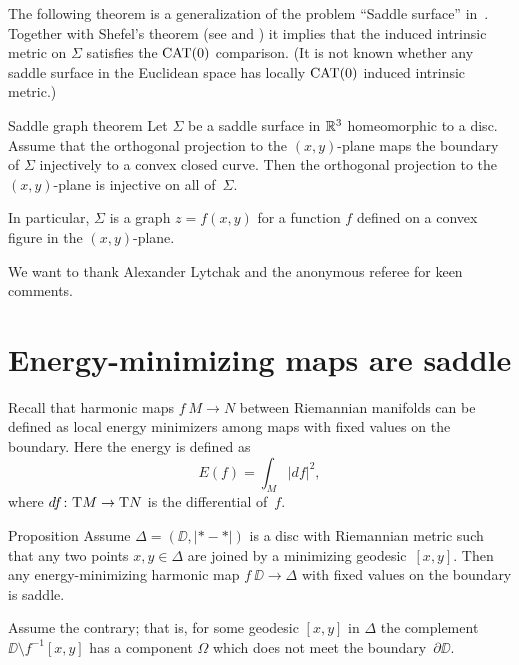 \documentclass{article}
\begin{document}
The following theorem is a generalization of the problem ``Saddle surface'' in~\cite{petrunin-orthodox}.
Together with Shefel's theorem (see \cite{shefel-3D} and \cite[4.5.5]{akp}) it implies that the induced 
intrinsic metric on $\Sigma$ satisfies the $\mathop{\rm CAT}\nolimits(0)$ comparison. 
(It is not known whether any saddle surface in the Euclidean space has locally $\mathop{\rm CAT}\nolimits(0)$ induced intrinsic metric.)

\begin{thm}{Saddle graph theorem}\label{cor:projection}
Let $\Sigma$ be a saddle surface in $\mathbb{R}^3$ homeomorphic to a disc.
Assume that the orthogonal projection to the $(x,y)$-plane
maps the boundary of $\Sigma$
injectively to a convex closed curve.
Then the orthogonal projection to the $(x,y)$-plane is injective on all of~$\Sigma$.

In particular, $\Sigma$ is a graph $z=f(x,y)$ for a function $f$ defined on a convex figure in the $(x,y)$-plane.
\end{thm}

\medskip

We want to thank Alexander Lytchak and the anonymous referee for keen comments.

\section{Energy-minimizing maps are saddle}

Recall that harmonic maps $f\:M\to N$ between Riemannian manifolds can be defined as local energy minimizers 
among maps with fixed values on the boundary.
Here the energy is defined as 
\[E(f)=\int_M|df|^2,\]
where $df\colon\mathrm{T} M\to \mathrm{T} N$ is the differential of~$f$.

\begin{thm}{Proposition} 
Assume $\Delta=(\DD,|{*}-{*}|)$ is a disc with Riemannian metric such that any two points $x,y\in\Delta$ are joined by a minimizing geodesic~$[x,y]$.
Then any energy-minimizing harmonic map $f\:\DD\to\Delta$ with fixed values on the boundary is saddle.
\end{thm}

Assume the contrary; that is, for some geodesic $[x,y]$ in $\Delta$ the complement $\DD\setminus f^{-1}[x,y]$ has a component 
$\Omega$ which does not meet the boundary~$\partial\DD$.
\end{document}
